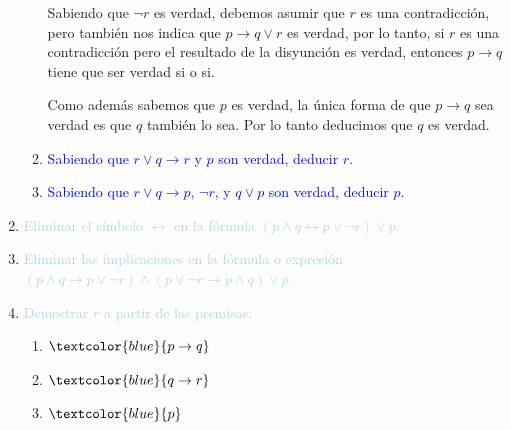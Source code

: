 \documentclass{article}
\newcommand{\lb}[1]{\textcolor{lightblue}{#1}}
\newcommand{\db}[1]{\textcolor{blue}{#1}}
\begin{document}
\begin{enumerate}[label=\color{red}\textbf{\arabic*)}, leftmargin=*]
\begin{enumerate}[label=\color{red}\alph*)]
            Sabiendo que $\neg r$ es verdad, debemos asumir que $r$ es una contradicción, pero también nos indica que $p\to q\vee r$ es verdad, por lo tanto, si $r$ es una contradicción pero el resultado de la disyunción es verdad, entonces $p\to q$ tiene que ser verdad si o si.
            
            Como además sabemos que $p$ es verdad, la única forma de que $p\to q$ sea verdad es que $q$ también lo sea. Por lo tanto deducimos que $q$ es verdad.
            \item \db{Sabiendo que $r\vee q\to r$ y $p$ son verdad, deducir $r$.}
            
            
            \item \db{Sabiendo que $r\vee q\to p,\,\neg r$, y $q\vee p$ son verdad, deducir $p$.}
      \end{enumerate}
      \item \lb{Eliminar el símbolo $\longleftrightarrow$ en la fórmula $(p\wedge q\leftrightarrow p\vee\neg r)\vee p$.}
      \item \lb{Eliminar las implicaciones en la fórmula o expresión $(p\wedge q\to p\vee\neg r)\wedge(p\vee\neg r\to p\wedge q)\vee p$.}
      \item \lb{Demostrar $r$ a partir de las premisas:}
      \begin{enumerate}[label=\color{red}\alph*)]
            \item $\db{p\to q}$
            \item $\db{q\to r}$
            \item $\db{p}$
      \end{enumerate}
      

\end{enumerate}
\end{document}
